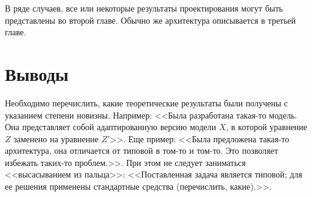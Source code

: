 В ряде случаев, все или некоторые результаты проектирования могут быть представлены во второй главе. Обычно же архитектура описывается в третьей главе.

\section{Выводы}

Необходимо перечислить, какие теоретические результаты были получены с 
указанием степени новизны. Например: <<Была разработана такая-то модель. Она 
представляет собой адаптированную версию модели $X$, в которой уравнение $Z$ 
заменено на уравнение $Z'$>>. Еще пример: <<Была предложена такая-то 
архитектура, она отличается от типовой в том-то и том-то. Это позволяет 
избежать таких-то проблем.>>. При этом не следует заниматься <<высасыванием из 
пальца>>: <<Поставленная задача является типовой; для ее решения применены 
стандартные средства (перечислить, какие).>>.
